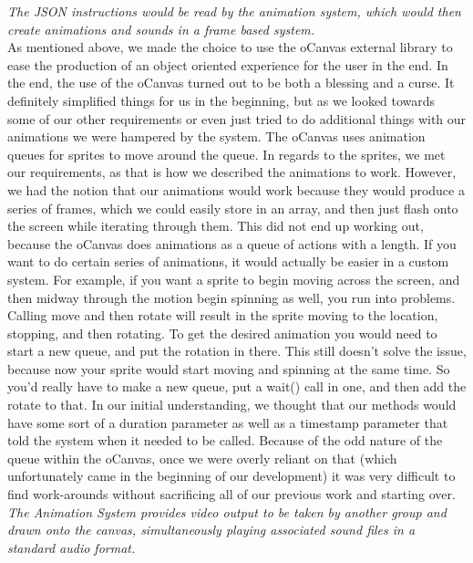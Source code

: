 \documentclass[12pt]{article}
\begin{document}
\noindent\textit{The JSON instructions would be read by the animation system, which would then create animations and sounds in a frame based system.}\\

As mentioned above, we made the choice to use the oCanvas external library to ease the production of an object oriented experience for the user in the end. In the end, the use of the oCanvas turned out to be both a blessing and a curse. It definitely simplified things for us in the beginning, but as we looked towards some of our other requirements or even just tried to do additional things with our animations we were hampered by the system. The oCanvas uses animation queues for sprites to move around the queue. In regards to the sprites, we met our requirements, as that is how we described the animations to work. However, we had the notion that our animations would work because they would produce a series of frames, which we could easily store in an array, and then just flash onto the screen while iterating through them. This did not end up working out, because the oCanvas does animations as a queue of actions with a length. If you want to do certain series of animations, it would actually be easier in a custom system. For example, if you want a sprite to begin moving across the screen, and then midway through the motion begin spinning as well, you run into problems. Calling move and then rotate will result in the sprite moving to the location, stopping, and then rotating. To get the desired animation you would need to start a new queue, and put the rotation in there. This still doesn’t solve the issue, because now your sprite would start moving and spinning at the same time. So you’d really have to make a new queue, put a wait() call in one, and then add the rotate to that. In our initial understanding, we thought that our methods would have some sort of a duration parameter as well as a timestamp parameter that told the system when it needed to be called. Because of the odd nature of the queue within the oCanvas, once we were overly reliant on that (which unfortunately came in the beginning of our development) it was very difficult to find work-arounds without sacrificing all of our previous work and starting over.\\

\noindent\textit{The Animation System provides video output to be taken by another group and drawn onto the canvas, simultaneously playing associated sound files in a standard audio format.}\\
\end{document}
